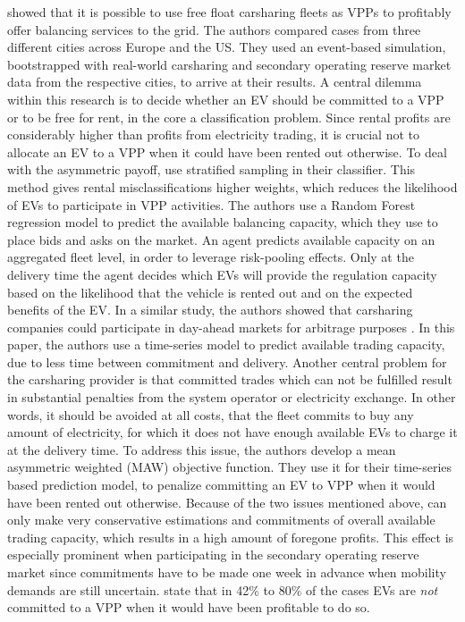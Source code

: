 \documentclass[12pt, article]{article}
\begin{document}
\textcite{kahlen17_fleet} showed that it is possible to use free float carsharing
fleets as VPPs to profitably offer balancing services to the grid. The authors
compared cases from three different cities across Europe and the US.
They used an event-based simulation, bootstrapped with real-world carsharing
and secondary operating reserve market data from the respective cities, to
arrive at their results. A central dilemma within this research is to decide
whether an EV should be committed to a VPP or to be free for rent, in the core a
classification problem. Since rental profits are considerably higher than
profits from electricity trading, it is crucial not to allocate an EV to a VPP
when it could have been rented out otherwise. To deal with the asymmetric
payoff, \citeauthor{kahlen17_fleet} use stratified sampling in their classifier.
This method gives rental misclassifications higher weights, which reduces the
likelihood of EVs to participate in VPP activities. The authors use a Random
Forest regression model to predict the available balancing capacity, which they
use to place bids and asks on the market. An agent predicts available capacity
on an aggregated fleet level, in order to leverage risk-pooling effects. Only at
the delivery time the agent decides which EVs will provide the regulation
capacity based on the likelihood that the vehicle is rented out and on the
expected benefits of the EV. In a similar study, the authors showed that
carsharing companies could participate in day-ahead markets for arbitrage
purposes \parencite{kahlen18_elect_vehic_virtual_power_plant_dilem}. In this
paper, the authors use a time-series model to predict available trading
capacity, due to less time between commitment and delivery. Another central
problem for the carsharing provider is that committed trades which can not be
fulfilled result in substantial penalties from the system operator or
electricity exchange. In other words, it should be avoided at all costs, that
the fleet commits to buy any amount of electricity, for which it does not have
enough available EVs to charge it at the delivery time. To address this issue,
the authors develop a mean asymmetric weighted (MAW) objective function. They
use it for their time-series based prediction model, to penalize committing an
EV to VPP when it would have been rented out otherwise. Because of the two
issues mentioned above, \textcite{kahlen18_elect_vehic_virtual_power_plant_dilem}
can only make very conservative estimations and commitments of overall available
trading capacity, which results in a high amount of foregone profits. This
effect is especially prominent when participating in the secondary operating
reserve market since commitments have to be made one week in advance when
mobility demands are still uncertain. \textcite{kahlen17_fleet} state that in 42\%
to 80\% of the cases EVs are \emph{not} committed to a VPP when it would have been
profitable to do so.
\end{document}
